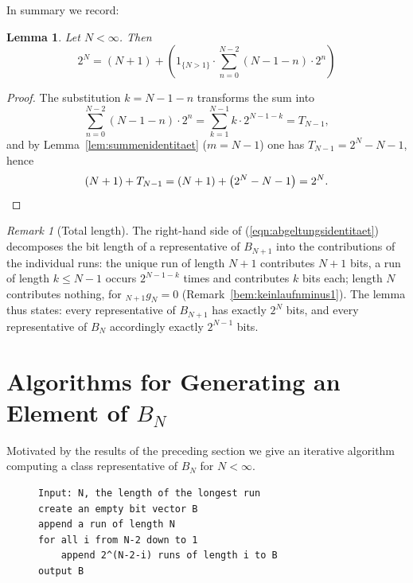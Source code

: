 \documentclass[11pt,a4paper]{scrartcl}
\theoremstyle{plain}
\newtheorem{lemma}[satz]{Lemma}
\theoremstyle{definition}
\theoremstyle{remark}
\newtheorem{bem}[satz]{Remark}
\begin{document}
In summary we record:

\begin{lemma}\label{lem:abgeltungsidentitaet}
Let $N<\infty$. Then
\begin{equation}\label{eqn:abgeltungsidentitaet}
  2^{N} = \left(N+1\right)+\left( 1_{\{N>1\}}\cdot\sum_{n=0}^{N-2} (N-1-n) \cdot 2^n\right)
\end{equation}
\end{lemma}

\begin{proof}
The substitution $k=N-1-n$ transforms the sum into
\begin{equation*}
  \sum_{n=0}^{N-2}\left(N-1-n\right)\cdot 2^{n}
  =\sum_{k=1}^{N-1}k\cdot 2^{N-1-k}=T_{N-1},
\end{equation*}
and by Lemma~\ref{lem:summenidentitaet} ($m=N-1$) one has
$T_{N-1}=2^{N}-N-1$, hence
\begin{equation*}
  \left(N+1\right)+T_{N-1}
  =\left(N+1\right)+\left(2^{N}-N-1\right)=2^{N}.\qedhere
\end{equation*}
\end{proof}

\begin{bem}[Total length]\label{bem:gesamtlaenge}
The right-hand side of (\ref{eqn:abgeltungsidentitaet}) decomposes
the bit length of a representative of $B_{N+1}$ into the
contributions of the individual runs: the unique run of length $N+1$
contributes $N+1$ bits, a run of length $k\leq N-1$ occurs
$2^{N-1-k}$ times and contributes $k$ bits each; length $N$ contributes
nothing, for $_{N+1}g_N=0$
(Remark~\ref{bem:keinlaufnminus1}). The lemma thus states: every
representative of $B_{N+1}$ has exactly $2^{N}$ bits, and every
representative of $B_N$ accordingly exactly $2^{N-1}$ bits.
\end{bem}

\section{Algorithms for Generating an Element of
\texorpdfstring{$B_N$}{B\_N}}\label{sec:algorithmen}

\noindent Motivated by the results of the preceding section we give
an iterative algorithm computing a class representative of $B_N$ for
$N<\infty$.

\begin{figure}[htbp]
\begin{lstlisting}[caption={Iterative generation of a sequence from B\_N for an arbitrary N},label={algo:iterativ}]
Input: N, the length of the longest run
create an empty bit vector B
append a run of length N
for all i from N-2 down to 1
    append 2^(N-2-i) runs of length i to B
output B
\end{lstlisting}
\end{figure}
\end{document}
